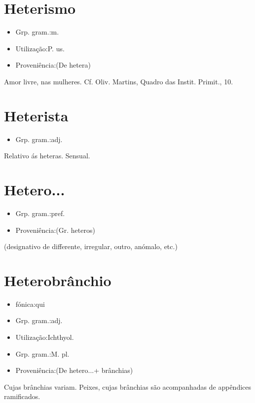\documentclass{article}
\begin{document}
\section{Heterismo}
\begin{itemize}
\item {Grp. gram.:m.}
\end{itemize}
\begin{itemize}
\item {Utilização:P. us.}
\end{itemize}
\begin{itemize}
\item {Proveniência:(De \textunderscore hetera\textunderscore )}
\end{itemize}
Amor livre, nas mulheres. Cf. Oliv. Martins, \textunderscore Quadro das Instit. Primit.\textunderscore , 10.
\section{Heterista}
\begin{itemize}
\item {Grp. gram.:adj.}
\end{itemize}
Relativo ás heteras.
Sensual.
\section{Hetero...}
\begin{itemize}
\item {Grp. gram.:pref.}
\end{itemize}
\begin{itemize}
\item {Proveniência:(Gr. \textunderscore heteros\textunderscore )}
\end{itemize}
(designativo de \textunderscore differente\textunderscore , \textunderscore irregular\textunderscore , \textunderscore outro\textunderscore , \textunderscore anómalo\textunderscore , etc.)
\section{Heterobrânchio}
\begin{itemize}
\item {fónica:qui}
\end{itemize}
\begin{itemize}
\item {Grp. gram.:adj.}
\end{itemize}
\begin{itemize}
\item {Utilização:Ichthyol.}
\end{itemize}
\begin{itemize}
\item {Grp. gram.:M. pl.}
\end{itemize}
\begin{itemize}
\item {Proveniência:(De \textunderscore hetero...\textunderscore  + \textunderscore brânchias\textunderscore )}
\end{itemize}
Cujas brânchias variam.
Peixes, cujas brânchias são acompanhadas de appêndices ramificados.
\end{document}
